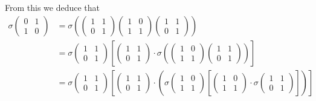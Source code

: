 From this we deduce that
\begin{align*}
\sigma\left(\begin{matrix} 0 & 1 \\ 1 & 0 \end{matrix}\right) &=
\sigma\left(
\left(\begin{matrix} 1 & 1 \\ 0 & 1 \end{matrix}\right)
\left(\begin{matrix} 1 & 0 \\ 1 & 1 \end{matrix}\right)
\left(\begin{matrix} 1 & 1 \\ 0 & 1 \end{matrix}\right)
\right) \\
&=
\sigma
\left(\begin{matrix} 1 & 1 \\ 0 & 1 \end{matrix}\right)
\left[
\left(\begin{matrix} 1 & 1 \\ 0 & 1 \end{matrix}\right)
\cdot
\sigma\left(
\left(\begin{matrix} 1 & 0 \\ 1 & 1 \end{matrix}\right)
\left(\begin{matrix} 1 & 1 \\ 0 & 1 \end{matrix}\right)
\right)\right] \\
&=
\sigma
\left(\begin{matrix} 1 & 1 \\ 0 & 1 \end{matrix}\right)
\left[
\left(\begin{matrix} 1 & 1 \\ 0 & 1 \end{matrix}\right)
\cdot
\left(
\sigma\left(\begin{matrix} 1 & 0 \\ 1 & 1 \end{matrix}\right)
\left[
\left(\begin{matrix} 1 & 0 \\ 1 & 1 \end{matrix}\right)
\cdot
\sigma\left(\begin{matrix} 1 & 1 \\ 0 & 1 \end{matrix}\right)
\right]\right)\right] \\

\end{align*}
